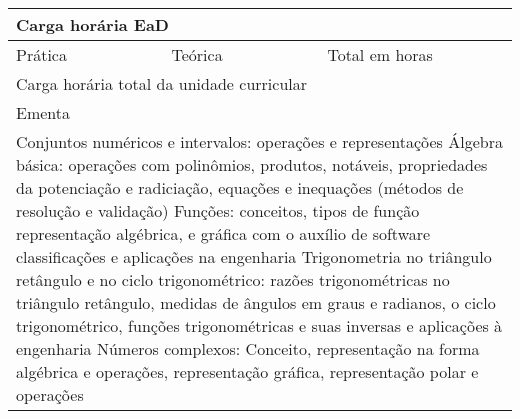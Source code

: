 \begin{quadro}[h!]
\begin{tabular}{|p{3cm} p{2cm} p{3cm} p{2cm} p{3cm} p{2cm}|}
\multicolumn{6}{|p{15cm}|}{\cellcolor{blue1} Carga horária EaD} \\ \hline
\multicolumn{1}{|p{3cm}|}{\raggedleft Prática} & \multicolumn{1}{p{1cm}|}{\centering 0} &  \multicolumn{1}{p{3cm}|}{\raggedleft Teórica}  & \multicolumn{1}{p{1cm}|}{\centering 0} & \multicolumn{1}{p{3cm}|}{\raggedleft Total em horas} & \multicolumn{1}{p{1cm}|}{\raggedleft 0} \\ \hline
\multicolumn{5}{|p{13cm}|}{\cellcolor{blue1} Carga horária total da unidade curricular} & \multicolumn{1}{p{1cm}|}{\raggedleft 60	}\\\hline
\multicolumn{6}{|p{15cm}|}{\cellcolor{blue1} Ementa} \\\hline
\hline\multicolumn{6}{|p{15cm}|}{\scriptsize Conjuntos numéricos e intervalos: operações e representações Álgebra básica: operações com polinômios, produtos, notáveis, propriedades da potenciação e radiciação, equações e inequações (métodos de resolução e validação) Funções: conceitos, tipos de função representação algébrica, e gráfica com o auxílio de software classificações e aplicações na engenharia Trigonometria no triângulo retângulo e no ciclo trigonométrico: razões trigonométricas no triângulo retângulo, medidas de ângulos em graus e radianos, o ciclo trigonométrico, funções trigonométricas e suas inversas e aplicações à engenharia Números complexos: Conceito, representação na forma algébrica e operações, representação gráfica, representação polar e operações}\\\hline
\hline
	\end{tabular}
\end{quadro}
